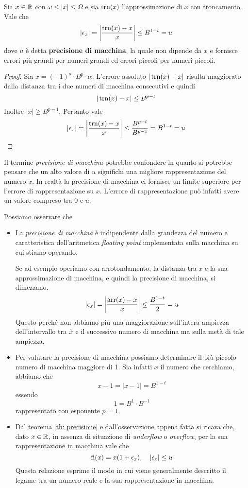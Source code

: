 \begin{theorem}\label{th: precisione}
	Sia $x \in \mathbb{R}$ con $\omega \leq |x| \leq \Omega$ e sia $\operatorname{trn}(x)$ l'approssimazione di $x$ con troncamento.
	Vale che
	\[ |\epsilon_x| = \left| \frac{\operatorname{trn}(x) - x}{x} \right| \leq B^{1-t} = u \]
	dove $u$ è detta \textbf{precisione di macchina}, la quale non dipende da $x$ e fornisce errori più grandi
	per numeri grandi ed errori piccoli per numeri piccoli.
	\begin{proof}
		Sia $x = (-1)^s \cdot B^p \cdot \alpha$. L'errore assoluto $|\operatorname{trn}(x) - x|$ risulta maggiorato dalla
		distanza tra i due numeri di macchina consecutivi e quindi
		\[ |\operatorname{trn}(x) - x| \leq B^{p-t} \]
		Inoltre $|x| \geq B^{p-1}$. Pertanto vale
		\[ |\epsilon_x| = \left| \frac{\operatorname{trn}(x) - x}{x} \right| \leq \frac{B^{p-t}}{B^{p-1}} = B^{1-t} = u \]
	\end{proof}
\end{theorem}

Il termine \emph{precisione di macchina} potrebbe confondere in quanto si potrebbe pensare che un alto valore
di $u$ significhi una migliore rappresentazione del numero $x$. In realtà la precisione di macchina ci fornisce
un limite superiore per l'errore di rappresentazione su $x$. L'errore di rappresentazione può infatti avere un
valore compreso tra 0 e $u$.

\begin{observation}
	Possiamo osservare che
	\begin{itemize}
		\item La \emph{precisione di macchina} è indipendente dalla grandezza del numero e caratteristica
		      dell'aritmetica \emph{floating point} implementata sulla macchina su cui stiamo operando.

		      Se ad esempio operiamo con arrotondamento, la distanza tra $x$ e la sua approssimazione di
		      macchina, e quindi la precisione di macchina, si dimezzano.
		      \[ |\epsilon_x| = \left| \frac{\operatorname{arr}(x) - x}{x} \right| \leq \frac{B^{1 - t}}{2} = u \]
		      Questo perché non abbiamo più una
		      maggiorazione sull'intera ampiezza dell'intervallo tra $\tilde{x}$ e il successivo numero di
		      macchina ma sulla metà di tale ampiezza.
		\item Per valutare la precisione di macchina possiamo determinare il più piccolo numero di macchina
		      maggiore di 1. Sia infatti $x$ il numero che cerchiamo, abbiamo che
		      \[ x - 1 = |x - 1| = B^{1-t} \]
		      essendo
		      \[ 1 = B^1 \cdot B^{-1} \]
		      rappresentato con esponente $p = 1$.
		\item Dal teorema \ref{th: precisione} e dall'osservazione appena fatta si ricava che, dato $x \in \mathbb{R}$,
		      in assenza di situazione di \emph{underflow} o \emph{overflow}, per la sua rappresentazione in
		      macchina vale che
		      \[ \operatorname{fl}(x) = x (1 + \epsilon_x), \quad |\epsilon_x| \leq u \]
		      Questa relazione esprime il modo in cui viene generalmente descritto il legame tra un numero reale
		      e la sua rappresentazione in macchina.
	\end{itemize}
\end{observation}

